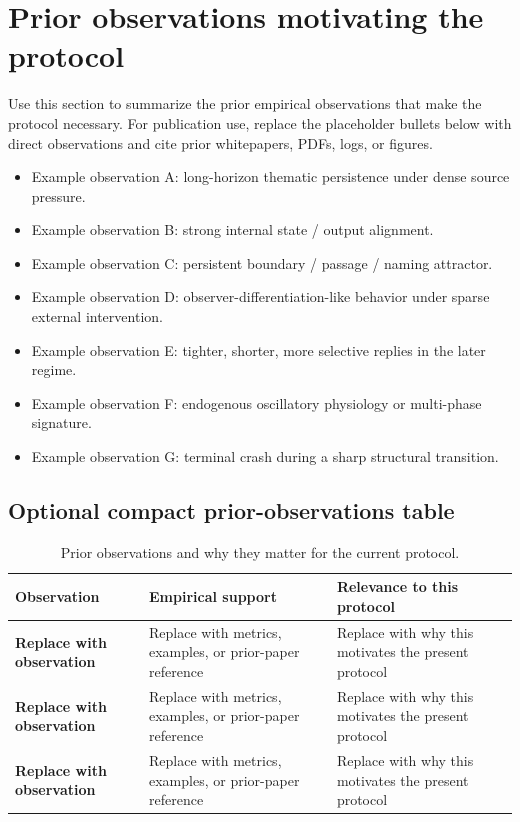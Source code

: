 \documentclass[11pt]{article}
\begin{document}
\section{Prior observations motivating the protocol}

Use this section to summarize the prior empirical observations that make the protocol necessary. For publication use, replace the placeholder bullets below with direct observations and cite prior whitepapers, PDFs, logs, or figures.

\begin{itemize}[leftmargin=1.5em]
  \item Example observation A: long-horizon thematic persistence under dense source pressure.
  \item Example observation B: strong internal state / output alignment.
  \item Example observation C: persistent boundary / passage / naming attractor.
  \item Example observation D: observer-differentiation-like behavior under sparse external intervention.
  \item Example observation E: tighter, shorter, more selective replies in the later regime.
  \item Example observation F: endogenous oscillatory physiology or multi-phase signature.
  \item Example observation G: terminal crash during a sharp structural transition.
\end{itemize}

\subsection{Optional compact prior-observations table}

\begin{table}[H]
\centering
\caption{Prior observations and why they matter for the current protocol.}
\begin{tabularx}{\textwidth}{>{\bfseries}p{} >{\raggedright\arraybackslash}X >{\raggedright\arraybackslash}p{}}
\toprule
Observation & Empirical support & Relevance to this protocol \\
\midrule
Replace with observation & Replace with metrics, examples, or prior-paper reference & Replace with why this motivates the present protocol \\
Replace with observation & Replace with metrics, examples, or prior-paper reference & Replace with why this motivates the present protocol \\
Replace with observation & Replace with metrics, examples, or prior-paper reference & Replace with why this motivates the present protocol \\
\bottomrule
\end{tabularx}
\end{table}
\end{document}
